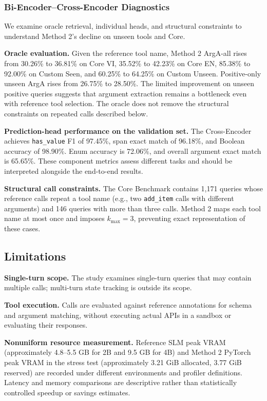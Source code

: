 \documentclass[10pt,twocolumn,a4paper]{article}
\begin{document}
\subsubsection{Bi-Encoder--Cross-Encoder Diagnostics}
\label{sec:diagnostics}
We examine oracle retrieval, individual heads, and structural constraints to understand Method 2's decline on unseen tools and Core.

\textbf{Oracle evaluation.} Given the reference tool name, Method 2 ArgA-all rises from 30.26\% to 36.81\% on Core VI, 35.52\% to 42.23\% on Core EN, 85.38\% to 92.00\% on Custom Seen, and 60.25\% to 64.25\% on Custom Unseen. Positive-only unseen ArgA rises from 26.75\% to 28.50\%. The limited improvement on unseen positive queries suggests that argument extraction remains a bottleneck even with reference tool selection. The oracle does not remove the structural constraints on repeated calls described below.

\textbf{Prediction-head performance on the validation set.} The Cross-Encoder achieves \texttt{has\_value} F1 of 97.45\%, span exact match of 96.18\%, and Boolean accuracy of 98.90\%. Enum accuracy is 72.06\%, and overall argument exact match is 65.65\%. These component metrics assess different tasks and should be interpreted alongside the end-to-end results.

\textbf{Structural call constraints.} The Core Benchmark contains 1,171 queries whose reference calls repeat a tool name (e.g., two \texttt{add\_item} calls with different arguments) and 146 queries with more than three calls. Method 2 maps each tool name at most once and imposes $k_{\max}=3$, preventing exact representation of these cases.

\subsection{Limitations}
\textbf{Single-turn scope.} The study examines single-turn queries that may contain multiple calls; multi-turn state tracking is outside its scope.

\textbf{Tool execution.} Calls are evaluated against reference annotations for schema and argument matching, without executing actual APIs in a sandbox or evaluating their responses.

\textbf{Nonuniform resource measurement.} Reference SLM peak VRAM (approximately 4.8--5.5 GB for 2B and 9.5 GB for 4B) and Method 2 PyTorch peak VRAM in the stress test (approximately 3.21 GiB allocated, 3.77 GiB reserved) are recorded under different environments and profiler definitions. Latency and memory comparisons are descriptive rather than statistically controlled speedup or savings estimates.
\end{document}
